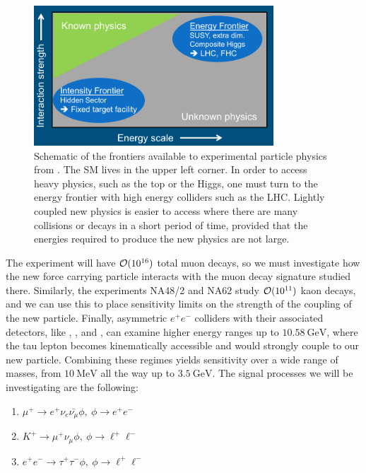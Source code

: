 \begin{figure}[h]
    \centering
    \includegraphics[width = 0.8\textwidth]{Figures/misc/frontiers}
    \caption{Schematic of the frontiers available to experimental particle physics from \cite{Alekhin:2015byh}. The SM lives in the upper left corner. In order to access heavy physics, such as the top or the Higgs, one must turn to the energy frontier with high energy colliders such as the LHC. Lightly coupled new physics is easier to access where there are many collisions or decays in a short period of time, provided that the energies required to produce the new physics are not large.}
    \label{fig:frontiers}
\end{figure}

The experiment \mueee will have $\operatorname{\mathcal{O}}(10^{16})$ total muon decays, so we must investigate how the new force carrying particle interacts with the muon decay signature studied there.
Similarly, the experiments NA48/2 and NA62 study $\operatorname{\mathcal{O}}(10^{11})$ kaon decays, and we can use this to place sensitivity limits on the strength of the coupling of the new particle.
Finally, asymmetric $e^+ e^-$ colliders with their associated detectors, like \babar, \belle, and \belletwo, can examine higher energy ranges up to $10.58~\textrm{GeV}$, where the tau lepton becomes kinematically accessible and would strongly couple to our new particle.
Combining these regimes yields sensitivity over a wide range of masses, from $10~\textrm{MeV}$ all the way up to $3.5~\textrm{GeV}$.
The signal processes we will be investigating are the following:

\begin{enumerate}
\item $\mu^+ \rightarrow e^+ \nu_e \bar{\nu_\mu} \phi,~\phi \rightarrow e^+ e^-$
\item $K^+ \rightarrow \mu^+ \nu_\mu \phi,~\phi \rightarrow \ell^+ \ell^-$
\item $e^+ e^- \rightarrow \tau^+ \tau^- \phi,~\phi \rightarrow \ell^+ \ell^-$
\end{enumerate}

